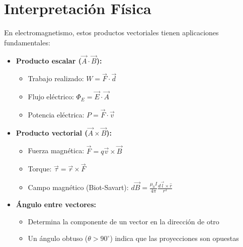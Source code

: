 \documentclass[12pt,letterpaper]{article}
\begin{document}
\section*{Interpretaci\'on F\'isica}

En electromagnetismo, estos productos vectoriales tienen aplicaciones fundamentales:

\begin{itemize}
    \item \textbf{Producto escalar ($\vec{A} \cdot \vec{B}$):}
    \begin{itemize}
        \item Trabajo realizado: $W = \vec{F} \cdot \vec{d}$
        \item Flujo el\'ectrico: $\Phi_E = \vec{E} \cdot \vec{A}$
        \item Potencia el\'ectrica: $P = \vec{F} \cdot \vec{v}$
    \end{itemize}

    \item \textbf{Producto vectorial ($\vec{A} \times \vec{B}$):}
    \begin{itemize}
        \item Fuerza magn\'etica: $\vec{F} = q\vec{v} \times \vec{B}$
        \item Torque: $\vec{\tau} = \vec{r} \times \vec{F}$
        \item Campo magn\'etico (Biot-Savart): $d\vec{B} = \frac{\mu_0 I}{4\pi} \frac{d\vec{l} \times \hat{r}}{r^2}$
    \end{itemize}

    \item \textbf{\'Angulo entre vectores:}
    \begin{itemize}
        \item Determina la componente de un vector en la direcci\'on de otro
        \item Un \'angulo obtuso ($\theta > 90^\circ$) indica que las proyecciones son opuestas
    \end{itemize}
\end{itemize}
\end{document}
